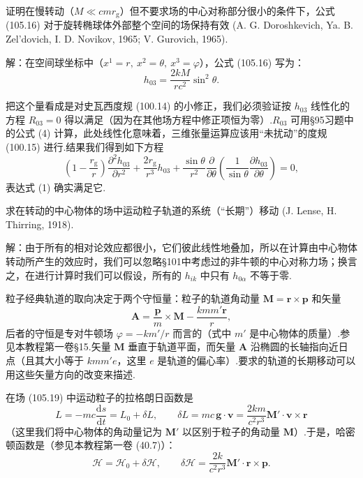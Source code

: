 \begin{xiti}

\quad 证明在慢转动（$M\ll cmr_{\mathrm{g}}$）但不要求场的中心对称部分很小的条件下，公式 (105.16) 对于旋转椭球体外部整个空间的场保持有效 (A. G. Doroshkevich, Ya. B. Zel'dovich, I. D. Novikov, 1965; V. Gurovich, 1965).

解：在空间球坐标中（$x^1=r,\ x^2=\theta,\ x^3=\varphi$），公式 (105.16) 写为：
\begin{equation}
  h_{03}=\frac{2kM}{rc^{2}}\sin^{2}\theta.
  \tag{1}
\end{equation}

把这个量看成是对史瓦西度规 (100.14) 的小修正，我们必须验证按 $h_{03}$ 线性化的方程 $R_{03}=0$ 得以满足（因为在其他场方程中修正项恒为零）.$R_{03}$ 可用§95习题中的公式 (4) 计算，此处线性化意味着，三维张量运算应该用“未扰动”的度规 (100.15) 进行.结果我们得到如下方程
\begin{equation*}
  \left(1-\frac{r_{\mathrm{g}}}{r}\right)
  \frac{\partial^{2}h_{03}}{\partial r^{2}}
  +\frac{2r_{\mathrm{g}}}{r^{3}}h_{03}
  +\frac{\sin\theta}{r^{2}}\frac{\partial}{\partial\theta}
  \left(\frac{1}{\sin\theta}\frac{\partial h_{03}}{\partial\theta}\right)=0,
\end{equation*}
表达式 (1) 确实满足它.

\quad 求在转动的中心物体的场中运动粒子轨道的系统（“长期”）移动 (J. Lense, H. Thirring, 1918).

解：由于所有的相对论效应都很小，它们彼此线性地叠加，所以在计算由中心物体转动所产生的效应时，我们可以忽略§101中考虑过的非牛顿的中心对称力场；换言之，在进行计算时我们可以假设，所有的 $h_{ik}$ 中只有 $h_{0\alpha}$ 不等于零.

粒子经典轨道的取向决定于两个守恒量：粒子的轨道角动量 $\boldsymbol{M}=\boldsymbol{r}\times\boldsymbol{p}$ 和矢量
\begin{equation*}
  \boldsymbol{A}
  =\frac{\boldsymbol{p}}{m}\times\boldsymbol{M}
  -\frac{kmm'\boldsymbol{r}}{r},
\end{equation*}
后者的守恒是专对牛顿场 $\varphi=-km'/r$ 而言的（式中 $m'$ 是中心物体的质量）.参见本教程第一卷§15.矢量 $\boldsymbol{M}$ 垂直于轨道平面，而矢量 $\boldsymbol{A}$ 沿椭圆的长轴指向近日点（且其大小等于 $kmm'e$，这里 $e$ 是轨道的偏心率）.要求的轨道的长期移动可以用这些矢量方向的改变来描述.

在场 (105.19) 中运动粒子的拉格朗日函数是
\begin{equation}
  L=-mc\frac{\mathrm{d}s}{\mathrm{d}t}=L_0+\delta L,
  \qquad
  \delta L=mc\,\boldsymbol{g}\cdot\boldsymbol{v}
  =\frac{2km}{c^{2}r^{3}}\boldsymbol{M}'\cdot\boldsymbol{v}\times\boldsymbol{r}
  \tag{1}
\end{equation}
（这里我们将中心物体的角动量记为 $\boldsymbol{M}'$ 以区别于粒子的角动量 $\boldsymbol{M}$）.于是，哈密顿函数是（参见本教程第一卷 (40.7)）：
\begin{equation*}
  \mathcal{H}=\mathcal{H}_0+\delta\mathcal{H},
  \qquad
  \delta\mathcal{H}
  =\frac{2k}{c^{2}r^{3}}\boldsymbol{M}'\cdot\boldsymbol{r}\times\boldsymbol{p}.
\end{equation*}


\end{xiti}
